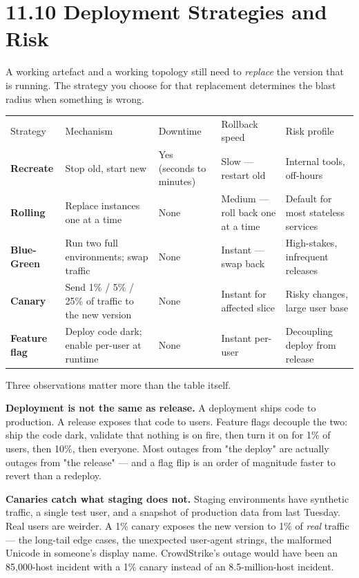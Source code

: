 \documentclass[11pt,a4paper]{book}
\begin{document}
\medskip

\section{11.10 Deployment Strategies and Risk}

A working artefact and a working topology still need to \textit{replace} the version that is running. The strategy you choose for that replacement determines the blast radius when something is wrong.

\begin{tabular}{lllll}
\hline
Strategy & Mechanism & Downtime & Rollback speed & Risk profile \\
\textbf{Recreate} & Stop old, start new & Yes (seconds to minutes) & Slow --- restart old & Internal tools, off-hours \\
\textbf{Rolling} & Replace instances one at a time & None & Medium --- roll back one at a time & Default for most stateless services \\
\textbf{Blue-Green} & Run two full environments; swap traffic & None & Instant --- swap back & High-stakes, infrequent releases \\
\textbf{Canary} & Send 1\% / 5\% / 25\% of traffic to the new version & None & Instant for affected slice & Risky changes, large user base \\
\textbf{Feature flag} & Deploy code dark; enable per-user at runtime & None & Instant per-user & Decoupling deploy from release \\
\hline
\end{tabular}

Three observations matter more than the table itself.

\textbf{Deployment is not the same as release.} A deployment ships code to production. A release exposes that code to users. Feature flags decouple the two: ship the code dark, validate that nothing is on fire, then turn it on for 1\% of users, then 10\%, then everyone. Most outages from "the deploy" are actually outages from "the release" --- and a flag flip is an order of magnitude faster to revert than a redeploy.

\textbf{Canaries catch what staging does not.} Staging environments have synthetic traffic, a single test user, and a snapshot of production data from last Tuesday. Real users are weirder. A 1\% canary exposes the new version to 1\% of \textit{real} traffic --- the long-tail edge cases, the unexpected user-agent strings, the malformed Unicode in someone's display name. CrowdStrike's outage would have been an 85,000-host incident with a 1\% canary instead of an 8.5-million-host incident.
\end{document}
